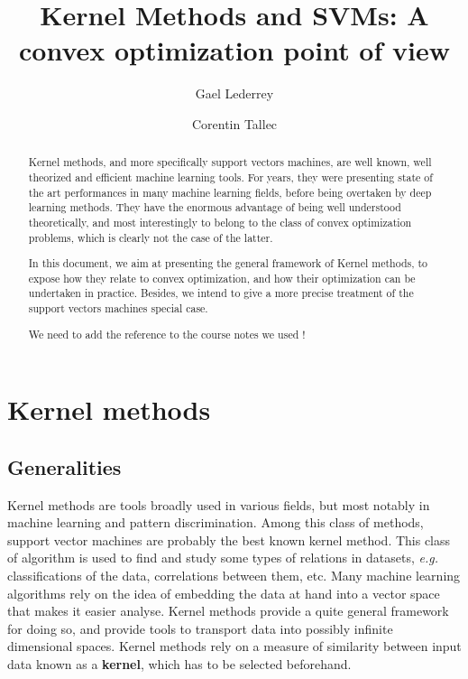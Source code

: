 \documentclass[a4paper, 11pt]{article}
\title{Kernel Methods and SVMs:
A convex optimization point of view}
\author{Gael Lederrey\\
  \and
Corentin Tallec}
\begin{document}
\maketitle
\begin{abstract}
  Kernel methods, and more specifically support vectors machines, are
  well known, well theorized and efficient machine learning tools. For
  years, they were presenting state of the art performances in many
  machine learning fields, before being overtaken by deep learning
  methods. They have the enormous advantage of being well understood
  theoretically, and most interestingly to belong to the class of
  convex optimization problems, which is clearly not the case of the
  latter.

  In this document, we aim at presenting the general framework of
  Kernel methods, to expose how they relate to convex optimization,
  and how their optimization can be undertaken in practice. Besides,
  we intend to give a more precise treatment of the support vectors
  machines special case.

  \color{red}We need to add the reference to the course notes we
  used !
  \color{black}
\end{abstract}

\section{Kernel methods}
\subsection{Generalities}
\label{sub:gen}

Kernel methods are tools broadly used in various fields, but most notably in
machine learning and pattern discrimination. Among this class of methods,
support vector machines are probably the best known kernel method. This class
of algorithm is used to find and study some types of relations in datasets,
{\it e.g.} classifications of the data, correlations between them, etc. Many
machine learning algorithms rely on the idea of embedding the data at hand
into a vector space that makes it easier analyse. Kernel methods provide
a quite general framework for doing so, and provide tools to transport data
into possibly infinite dimensional spaces. Kernel methods rely on a measure
of similarity between input data known as a {\bf kernel}, which has to be selected
beforehand.
\end{document}
